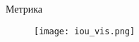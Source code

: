 
\begin{frame}{Метрика}
\begin{figure}
\centering
\texttt{[image: iou\_vis.png]}
\end{figure}
\end{frame}